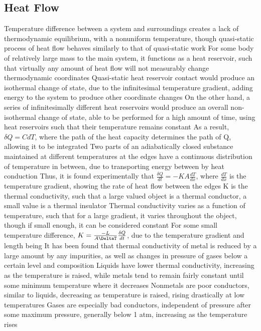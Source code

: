 \documentclass[11 pt, twoside]{article}
\newenvironment{outline*}
{
	\begin{outline}[enumerate]
	}
	{\end{outline}
}
\begin{document}
\subsection{Heat Flow}
\begin{outline*}
\1 Temperature difference between a system and surroundings creates a lack of thermodynamic equilibrium, with a nonuniform temperature, though quasi-static process of heat flow behaves similarly to that of quasi-static work
\2 For some body of relatively large mass to the main system, it functions as a heat reservoir, such that virtually any amount of heat flow will not measurably change thermodynamic coordinates
\2 Quasi-static heat reservoir contact would produce an isothermal change of state, due to the infinitesimal temperature gradient, adding energy to the system to produce other coordinate changes
\3 On the other hand, a series of infinitesimally different heat reservoirs would produce an overall non-isothermal change of state, able to be performed for a high amount of time, using heat reservoirs such that their temperature remains constant
\3 As a result, $\delta Q = CdT$, where the path of the heat capacity determines the path of Q, allowing it to be integrated
\1 Two parts of an adiabatically closed substance maintained at different temperatures at the edges have a continuous distribution of temperature in between, due to transporting energy between by heat conduction
\2 Thus, it is found experimentally that $\frac{\delta Q}{dt} = -KA\frac{dT}{dx}$, where $\frac{dT}{dx}$ is the temperature gradient, showing the rate of heat flow between the edges
\3 K is the thermal conductivity, such that a large valued object is a thermal conductor, a small value is a thermal insulator
\2 Thermal conductivity varies as a function of temperature, such that for a large gradient, it varies throughout the object, though if small enough, it can be considered constant
\3 For some small temperature difference, $K = \frac{-L}{A\DeltaT}\frac{\delta Q}{dt}$, due to the temperature gradient and length being
\2 It has been found that thermal conductivity of metal is reduced by a large amount by any impurities, as well as changes in pressure of gases below a certain level and composition
\3 Liquids have lower thermal conductivity, increasing as the temperature is raised, while metals tend to remain fairly constant until some minimum temperature where it decreases
\3 Nonmetals are poor conductors, similar to liquids, decreasing as temperature is raised, rising drastically at low temperatures
\3 Gases are especially bad conductors, independent of pressure after some maximum pressure, generally below 1 atm, increasing as the temperature rises

\end{outline*}
\end{document}
